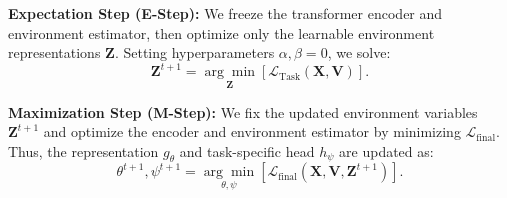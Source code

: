 \textbf{Expectation Step (E-Step):} We freeze the transformer encoder and environment estimator, then optimize only the learnable environment representations $\mathbf{Z}$. Setting hyperparameters $\alpha, \beta = 0$, we solve:
\begin{equation}
\mathbf{Z}^{t+1} = \underset{\mathbf{Z}}{\arg\min} \left[ \mathcal{L}_{\text{Task}}(\mathbf{X}, \mathbf{V}) \right]. \tag{16}
\end{equation}

\textbf{Maximization Step (M-Step):} We fix the updated environment variables $\mathbf{Z}^{t+1}$ and optimize the encoder and environment estimator by minimizing $\mathcal{L}_{\text{final}}$. Thus, the representation $g_\theta$ and task-specific head $h_\psi$ are updated as:
\begin{equation}
\theta^{t+1}, \psi^{t+1} = \underset{\theta, \psi}{\arg\min} \left[ \mathcal{L}_{\text{final}}(\mathbf{X}, \mathbf{V}, \mathbf{Z}^{t+1}) \right]. \tag{17}
\end{equation}





